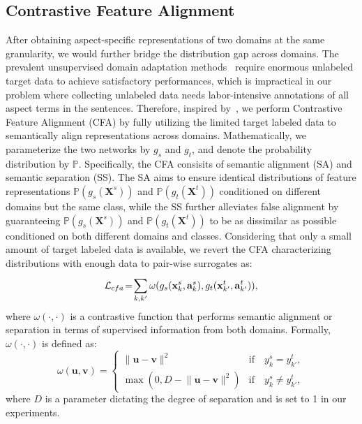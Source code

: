 \documentclass[letterpaper]{article} \usepackage{aaai19}  \usepackage{times}  \usepackage{latexsym}
\begin{document}
\subsection{Contrastive Feature Alignment}
After obtaining aspect-specific representations of two domains at the same granularity, we would further bridge the distribution gap across domains.
The prevalent unsupervised domain adaptation methods~\cite{gretton2007kernel,ganin2016domain} require enormous unlabeled target data to achieve satisfactory performances, which is impractical in our problem where collecting unlabeled data needs labor-intensive annotations of all aspect terms in the sentences. 
Therefore, inspired by~\cite{motiian2017unified}, we perform Contrastive Feature Alignment (CFA) by fully utilizing the limited target labeled data to semantically align representations across domains. Mathematically, we parameterize the two networks by ${g}_s$ and ${g}_t$, and denote the probability distribution by $\mathbb{P}$. Specifically, the CFA consisits of semantic alignment (SA) and semantic separation (SS). The SA aims to ensure identical distributions of feature representations $\mathbb{P}(g_s({ \mathbf{X} }^{ s }))$ and $\mathbb{P}(g_t({ \mathbf{X} }^{ t }))$ conditioned on different domains but the same class,  while the SS further alleviates false alignment by guaranteeing $\mathbb{P}(g_s({ \mathbf{X} }^{ s }))$ and $\mathbb{P}(g_t({ \mathbf{X} }^{ t }))$ to be as dissimilar as possible conditioned on both different domains and classes. Considering that only a small amount of target labeled data is available, we revert the CFA characterizing distributions with enough data to pair-wise surrogates as: 
\begin{equation}
\label{cfa}
\small{{{{{ \mathcal{L} }_{ cfa }\!=\!\sum _{ k,k' }^{  }{ \omega({  g_s({ \mathbf{x} }_{ k }^{ s },{ \mathbf{a} }_{ k }^{ s }), g_t({ \mathbf{x} }_{ k' }^{ t },{ \mathbf{a} }_{ k' }^{ t })  }) } }},}}
\end{equation}
where $\omega(\cdot, \cdot)$ is a contrastive function that performs semantic alignment or separation in terms of supervised information from both domains. Formally, $\omega(\cdot,\cdot)$ is defined as:
\begin{equation}
\omega(\mathbf{u}, \mathbf{v}) \!=\! \left\{ \begin{array}{ll}
\|\mathbf{u} \!-\! \mathbf{v} \|^{2}             & \text{if} \quad y^s_k = y^t_{k'},\\
\max(0, D \!-\!\|\mathbf{u} \!-\! \mathbf{v} \|^{2})  & \text{if} \quad y^s_k \neq y^t_{k'},
\end{array} \right.
\end{equation}
where $D$ is a parameter dictating the degree of separation and is set to 1 in our experiments. 
\end{document}
